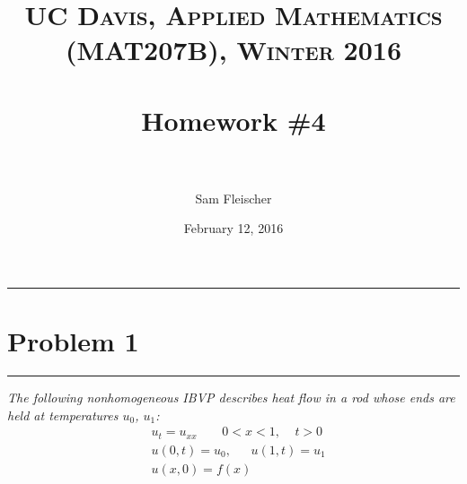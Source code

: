 \documentclass{article} %
\title{ 
\normalfont \normalsize 
\textsc{UC Davis, Applied Mathematics (MAT207B), Winter 2016} \\ [25pt] %
\horrule{2pt} \\[0.4cm] %
\Huge Homework \#4 \\ %
\horrule{2pt} \\[0.5cm] %
}
\author{\huge Sam Fleischer} %
\date{February 12, 2016} %
\theoremstyle{plain}
\newcommand{\problem}[1]{
\vspace{.375cm}
\begin{minipage}{\textwidth}
    \begin{center}
        \noindent\rule{5cm}{1pt}
    \end{center}
    \section{\bf #1}
    \begin{center}
        \noindent\rule{5cm}{1pt}
    \end{center}
    \vspace{0.25cm}
\end{minipage}
}
\begin{document}
\thispagestyle{empty}

\maketitle %

\makeatletter
{}
\makeatother

\pagebreak

\problem{Problem 1}
\emph{The following nonhomogeneous IBVP describes heat flow in a rod whose ends are held at temperatures $u_0$, $u_1$:}
\begin{equation}
    \label{Dirichlet_lin}
    \begin{aligned}
        &u_t = u_{xx}\ \ \ \ \ \ \ \ \ 0 < x < 1,\ \ \ \ \ t > 0 \\
        &u(0, t) = u_0, \ \ \ \ \ \ \ u(1,t) = u_1 \\
        &u(x,0) = f(x)
    \end{aligned}
\end{equation}
\end{document}
